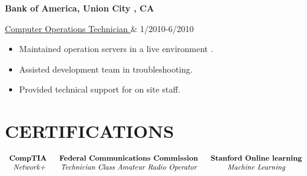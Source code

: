 \documentclass[overlapped,10pt]{res} %
\begin{document}
\begin{resume}
\begin{itemize}
               
					\end{itemize}   

  {\bf Bank of America,  Union City , CA } \\
                \begin{ncolumn}{2} %
                \underline{ Computer Operations Technician }     &      1/2010-6/2010
                \end{ncolumn}
\begin{itemize} \itemsep -2pt
				  \item[] 
 Maintained operation servers in a live environment .
				 \item[]
Assisted development team in troubleshooting.
 				\item[] 
  Provided technical support for on site staff.

               
					\end{itemize}   
		
	


\section{CERTIFICATIONS} 
$
\begin{array}{ccc} 

\textit{{\bf CompTIA} }
	      

&

\textit{ {\bf Federal Communications Commission} }
	         
&

\textit{ {\bf Stanford Online learning} }

\\
 \textit{Network+}
	      

&

 \textit{Technician Class Amateur Radio Operator}
	         
&

 \textit{Machine Learning}
	
 	
\end{array}
$

          	
   
\end{resume} 
\end{document}
